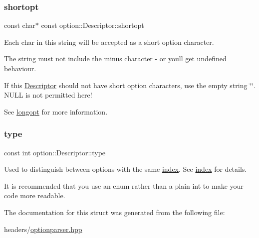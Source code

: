 \subsubsection{\texorpdfstring{shortopt}{shortopt}}
{\footnotesize\ttfamily const char$\ast$ const option\+::\+Descriptor\+::shortopt}



Each char in this string will be accepted as a short option character. 

The string must not include the minus character {\ttfamily \textquotesingle{}-\/\textquotesingle{}} or you\textquotesingle{}ll get undefined behaviour.

If this \hyperlink{structoption_1_1Descriptor}{Descriptor} should not have short option characters, use the empty string \char`\"{}\char`\"{}. N\+U\+LL is not permitted here!

See \hyperlink{structoption_1_1Descriptor_a470c449dfa894c9bfda2dae026142b4b}{longopt} for more information. \mbox{\label{structoption_1_1Descriptor_a1b220dabd8aad075fa441a80f9b9343c}} 
\subsubsection{\texorpdfstring{type}{type}}
{\footnotesize\ttfamily const int option\+::\+Descriptor\+::type}



Used to distinguish between options with the same \hyperlink{structoption_1_1Descriptor_a1fee8ac44f529c99ac2b1149b4c391b1}{index}. See \hyperlink{structoption_1_1Descriptor_a1fee8ac44f529c99ac2b1149b4c391b1}{index} for details. 

It is recommended that you use an enum rather than a plain int to make your code more readable. 

The documentation for this struct was generated from the following file\+:\begin{DoxyCompactItemize}
\item 
headers/\hyperlink{optionparser_8hpp}{optionparser.\+hpp}\end{DoxyCompactItemize}
